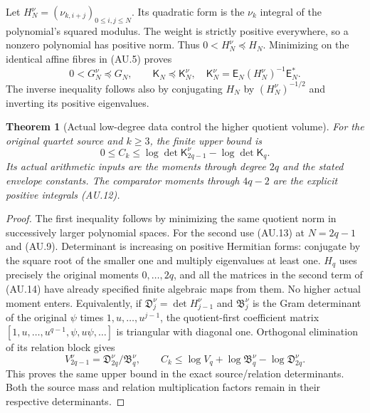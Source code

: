 \documentclass[11pt]{article}
\newtheorem{theorem}{Theorem}[section]
\begin{document}
Let $H_N^\nu=(\nu_{k,i+j})_{0\le i,j\le N}$. Its quadratic form is
the $\nu_k$ integral of the polynomial's squared modulus. The weight
is strictly positive everywhere, so a nonzero polynomial has positive
norm. Thus $0<H_N^\nu\preceq H_N$. Minimizing on the identical
affine fibres in (AU.5) proves
\[
 0<G_N^\nu\preceq G_N,\qquad
 \mathsf K_N\preceq\mathsf K_N^\nu,
 \quad \mathsf K_N^\nu=\mathsf E_N(H_N^\nu)^{-1}\mathsf E_N^*.
 \tag{AU.13}
\]
The inverse inequality follows also by conjugating $H_N$ by
$(H_N^\nu)^{-1/2}$ and inverting its positive eigenvalues.

\begin{theorem}[Actual low-degree data control the higher quotient volume]
For the original quartet source and $k\ge3$, the finite upper bound is
\[
 \boxed{0\le C_k\le
 \log\det\mathsf K_{2q-1}^\nu-\log\det\mathsf K_q.}        \tag{AU.14}
\]
Its actual arithmetic inputs are the moments through degree $2q$ and
the stated envelope constants. The comparator moments through $4q-2$
are the explicit positive integrals (AU.12).
\end{theorem}
\begin{proof}
The first inequality follows by minimizing the same quotient norm in
successively larger polynomial spaces. For the second use (AU.13) at
$N=2q-1$ and (AU.9). Determinant is increasing on positive Hermitian
forms: conjugate by the square root of the smaller one and multiply
eigenvalues at least one. $H_q$ uses precisely the original moments
$0,\ldots,2q$, and all the matrices in the second term of (AU.14) have
already specified finite algebraic maps from them. No higher actual
moment enters. Equivalently, if $\mathfrak D^\nu_j=\det H_{j-1}^\nu$
and $\mathfrak B^\nu_j$ is the Gram determinant of the original
$\psi$ times $1,u,\ldots,u^{j-1}$, the quotient-first coefficient
matrix $[1,u,\ldots,u^{q-1},\psi,u\psi,\ldots]$ is triangular with
diagonal one. Orthogonal elimination of its relation block gives
\[
 V_{2q-1}^\nu=\mathfrak D^\nu_{2q}/\mathfrak B^\nu_q,
 \qquad C_k\le\log V_q+
             \log\mathfrak B^\nu_q-\log\mathfrak D^\nu_{2q}.
 \tag{AU.15}
\]
This proves the same upper bound in the exact source/relation
determinants. Both the source mass and relation multiplication factors
remain in their respective determinants.
\end{proof}
\end{document}
